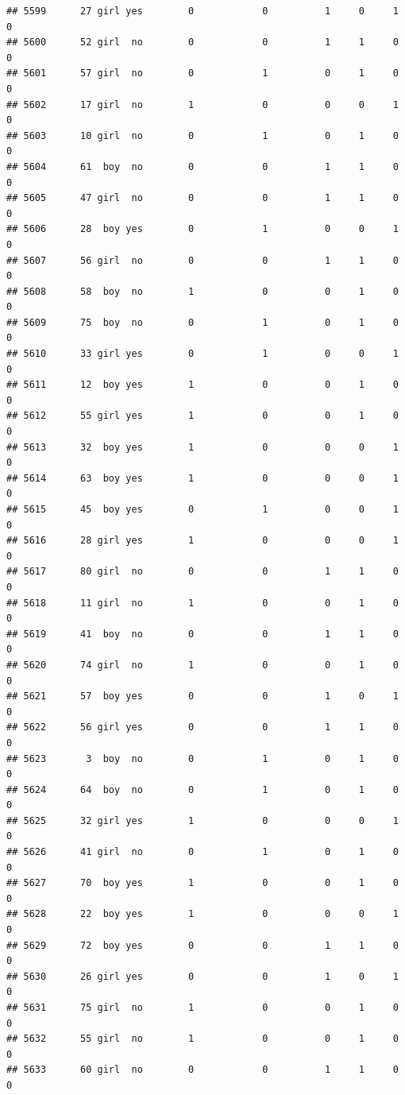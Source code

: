 \documentclass[man]{apa6}
\begin{document}
\begin{verbatim}
## 5599      27 girl yes        0            0          1     0     1     0
## 5600      52 girl  no        0            0          1     1     0     0
## 5601      57 girl  no        0            1          0     1     0     0
## 5602      17 girl  no        1            0          0     0     1     0
## 5603      10 girl  no        0            1          0     1     0     0
## 5604      61  boy  no        0            0          1     1     0     0
## 5605      47 girl  no        0            0          1     1     0     0
## 5606      28  boy yes        0            1          0     0     1     0
## 5607      56 girl  no        0            0          1     1     0     0
## 5608      58  boy  no        1            0          0     1     0     0
## 5609      75  boy  no        0            1          0     1     0     0
## 5610      33 girl yes        0            1          0     0     1     0
## 5611      12  boy yes        1            0          0     1     0     0
## 5612      55 girl yes        1            0          0     1     0     0
## 5613      32  boy yes        1            0          0     0     1     0
## 5614      63  boy yes        1            0          0     0     1     0
## 5615      45  boy yes        0            1          0     0     1     0
## 5616      28 girl yes        1            0          0     0     1     0
## 5617      80 girl  no        0            0          1     1     0     0
## 5618      11 girl  no        1            0          0     1     0     0
## 5619      41  boy  no        0            0          1     1     0     0
## 5620      74 girl  no        1            0          0     1     0     0
## 5621      57  boy yes        0            0          1     0     1     0
## 5622      56 girl yes        0            0          1     1     0     0
## 5623       3  boy  no        0            1          0     1     0     0
## 5624      64  boy  no        0            1          0     1     0     0
## 5625      32 girl yes        1            0          0     0     1     0
## 5626      41 girl  no        0            1          0     1     0     0
## 5627      70  boy yes        1            0          0     1     0     0
## 5628      22  boy yes        1            0          0     0     1     0
## 5629      72  boy yes        0            0          1     1     0     0
## 5630      26 girl yes        0            0          1     0     1     0
## 5631      75 girl  no        1            0          0     1     0     0
## 5632      55 girl  no        1            0          0     1     0     0
## 5633      60 girl  no        0            0          1     1     0     0

\end{verbatim}
\end{document}
